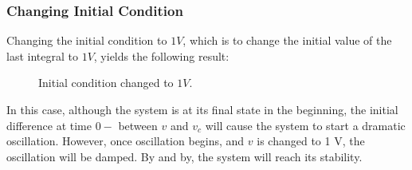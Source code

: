 \documentclass{article}
\begin{document}
  \subsubsection{Changing Initial Condition}
  Changing the initial condition to $1V$, which is to change the initial value of the last integral to $1V$, yields the following result:
  \begin{figure}[H]
    \centering
    \noindent{}
    \caption{Initial condition changed to $1 V$.} \label{fig:sm2}
  \end{figure}
  In this case, although the system is at its final state in the beginning, the initial difference at time $0-$ between $v$ and $v_c$ will cause the system to start a dramatic oscillation. However, once oscillation begins, and $v$ is changed to 1 V, the oscillation will be damped. By and by, the system will reach its stability.
  
\end{document}
